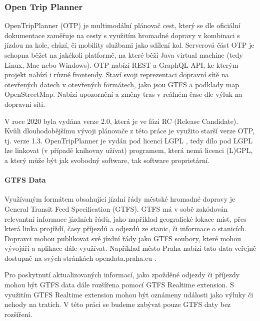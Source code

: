 \documentclass[thesis=M,czech]{FITthesis}[2019/12/23]
\theoremstyle{plain}
\theoremstyle{definition}
\begin{document}
\subsubsection{Open Trip Planner}
OpenTripPlanner (OTP)\cite{otp-site} je multimodální plánovač cest, který se dle oficiální dokumentace zaměřuje na cesty s využitím hromadné dopravy v kombinaci s jízdou na kole, chůzí, či mobility službami jako sdílení kol. Serverová část OTP je schopna běžet na jakékoli platformě, na které běží Java virtual machine (tedy Linux, Mac nebo Windows). OTP nabízí REST a GraphQL API, ke kterým projekt nabízí i různé frontendy. Staví svoji reprezentaci dopravní sítě na otevřených datech v otevřených formátech, jako jsou GTFS a podklady map OpenStreetMap. Nabízí upozornění a změny tras v reálném čase dle výluk na dopravní síti.

V roce 2020 byla vydána verze 2.0, která je ve fázi RC (Release Candidate). Kvůli dlouhodobějšímu vývoji plánovače z této práce je využito starší verze OTP, tj. verze 1.3. OpenTripPlanner je vydán pod licencí LGPL \cite{lgpl}, tedy dílo pod LGPL lze linkovat (v případě knihovny užívat) programem, která nemá licenci (L)GPL, a který může být jak svobodný software, tak software proprietární.\cite{lgpl-stallman}




\paragraph{GTFS Data}

Využívaným formátem obsahující jízdní řády městské hromadné dopravy je General Transit Feed Specification (GTFS)\cite{gtfs-spec}. GTFS má v sobě zakódován relevantní informace jízdních řádů, jako například geografické lokace míst, přes která linka projíždí, časy příjezdů a odjezdů ze stanic, či informace o stanicích. Dopravci mohou publikovat své jízdní řády jako GTFS soubory, které mohou vývojáři a aplikace dále využívat. Například město Praha nabízí tato data veřejně dostupně na svých stránkách opendata.praha.eu \cite{gtfs-prague}. 

Pro poskytnutí aktualizovaných informací, jako zpožděné odjezdy či příjezdy mohou být GTFS data dále rozšířena pomocí GTFS Realtime extension. S využitím GTFS Realtime extension mohou být oznámeny události jako výluky či nehody na tratích. V této práci se budeme zabývat pouze GTFS daty bez rozšíření.
\end{document}
